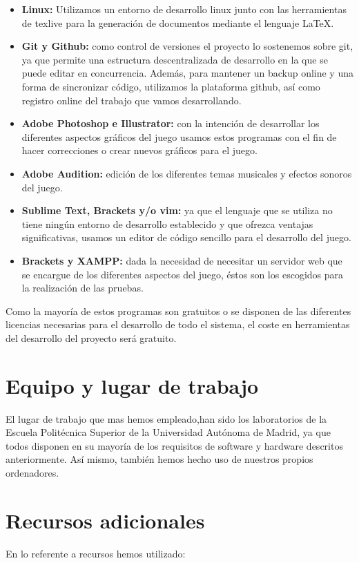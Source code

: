 \documentclass[palatino]{apuntes}
\begin{document}
\begin{itemize}
	\item \textbf{Linux:} Utilizamos un entorno de desarrollo linux junto con las herramientas de texlive para la generación de documentos mediante el lenguaje \LaTeX.
	\item \textbf{Git y Github:} como control de versiones el proyecto lo sostenemos sobre git, ya que permite una estructura descentralizada de desarrollo en la que se puede editar en concurrencia. Además, para mantener un backup online y una forma de sincronizar código, utilizamos la plataforma github, así como registro online del trabajo que vamos desarrollando.
	\item \textbf{Adobe Photoshop e Illustrator:} con la intención de desarrollar los diferentes aspectos gráficos del juego usamos estos programas con el fin de hacer correcciones o crear nuevos gráficos para el juego.
	\item \textbf{Adobe Audition:} edición de los diferentes temas musicales y efectos sonoros del juego.
	\item \textbf{Sublime Text, Brackets y/o vim:} ya que el lenguaje que se utiliza no tiene ningún entorno de desarrollo establecido y que ofrezca ventajas significativas, usamos un editor de código sencillo para el desarrollo del juego.
	\item \textbf{Brackets y XAMPP:} dada la necesidad de necesitar un servidor web que se encargue de los diferentes aspectos del juego, éstos son los escogidos para la realización de las pruebas.
\end{itemize}

Como la mayoría de estos programas son gratuitos o se disponen de las diferentes licencias necesarias para el desarrollo de todo el sistema, el coste en herramientas del desarrollo del proyecto será gratuito.


\section{Equipo y lugar de trabajo}

El lugar de trabajo que mas hemos empleado,han sido los laboratorios de la Escuela Politécnica Superior de la Universidad Autónoma de Madrid, ya que todos disponen en su mayoría de los requisitos de software y hardware descritos anteriormente. Así mismo, también hemos hecho uso de nuestros propios ordenadores.


\section{Recursos adicionales}
En lo referente a recursos hemos utilizado:
\end{document}
